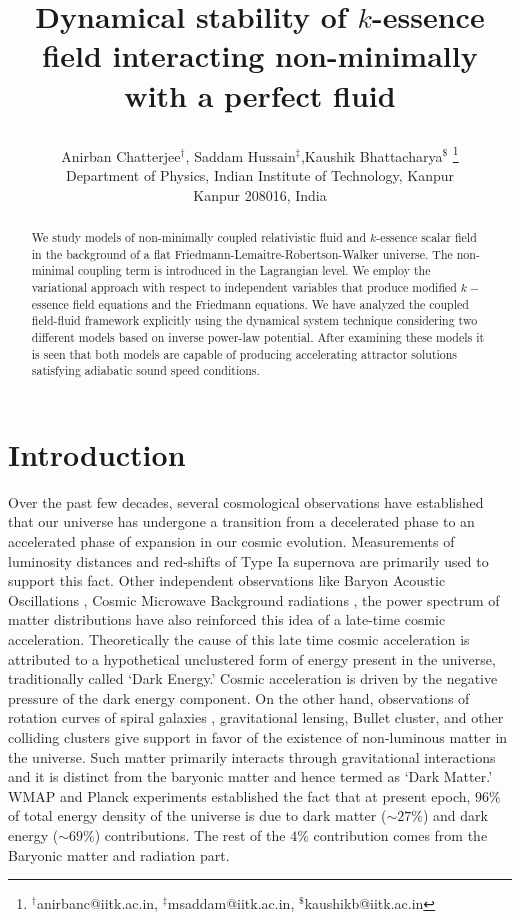 \documentclass[a4paper,12pt]{article}
\title{\centerline \bf Dynamical stability of $k$-essence field interacting non-minimally with a perfect fluid}
\author{Anirban Chatterjee$^\dagger$, Saddam Hussain$^\ddagger$,Kaushik Bhattacharya$^\$$
\thanks{$^\dagger$anirbanc@iitk.ac.in, $^\ddagger$msaddam@iitk.ac.in, $^\$$kaushikb@iitk.ac.in}
\\
\normalsize
Department of Physics, Indian Institute of Technology, Kanpur\\ 
\normalsize
Kanpur 208016, India
}
\begin{document}
\maketitle
\begin{abstract}
We study models of non-minimally coupled relativistic fluid and $k$-essence scalar field in the background of a flat Friedmann-Lemaitre-Robertson-Walker universe.  The non-minimal coupling term is introduced in the Lagrangian level. We employ the variational approach with respect to independent variables that produce modified $k-$essence field equations and the Friedmann equations. We have analyzed the coupled field-fluid framework explicitly using the dynamical system technique considering two different models based on inverse power-law potential. After examining these models it is seen that both models are capable of producing accelerating attractor solutions  satisfying adiabatic sound speed conditions. 
\end{abstract}
\section{Introduction}
\label{sec:intro}
	
Over the past few decades, several cosmological observations have established that our universe has undergone a transition from a decelerated phase to an accelerated phase of expansion in our cosmic evolution. Measurements of luminosity distances and red-shifts of Type Ia supernova \cite{Riess:1998cb,Perlmutter:1998np,Riess:2006fw} are primarily used to support this fact. Other independent observations like Baryon Acoustic Oscillations \cite{Eisenstein:2005su, Percival:2006gs}, Cosmic Microwave Background radiations \cite{Gawiser:2000az}, the power spectrum of matter distributions have also reinforced this idea of a late-time cosmic acceleration. Theoretically the cause of this late time cosmic acceleration is attributed to a hypothetical unclustered form of energy present in the universe, traditionally called  `Dark Energy.' Cosmic acceleration is driven by the negative pressure of the dark energy component. On the other hand, observations of rotation curves of spiral galaxies \cite{Sofue:2000jx}, gravitational lensing\cite{Bartelmann:1999yn}, Bullet cluster, and other colliding clusters give support in favor of the existence of non-luminous matter in the universe. Such matter primarily interacts through gravitational interactions and it is distinct from the baryonic matter and  hence  termed as `Dark Matter.'  WMAP \cite{Hinshaw:2008kr} and Planck \cite{Ade:2013zuv} experiments established the fact that at present epoch, $ 96\% $ of total energy density of the universe is due to dark matter ($\sim 27 \%$) and dark energy ($\sim 69 \%$) contributions. The rest of the $ 4\% $ contribution comes from the  Baryonic matter and radiation part.
	
\end{document}
